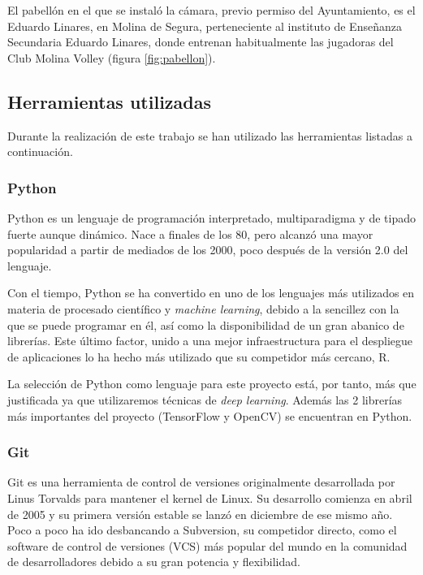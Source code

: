 El pabellón en el que se instaló la cámara, previo permiso del Ayuntamiento, es el Eduardo Linares, en Molina de Segura, perteneciente al instituto de Enseñanza Secundaria Eduardo Linares, donde entrenan habitualmente las jugadoras del Club Molina Volley (figura \ref{fig:pabellon}).


\subsection{Herramientas utilizadas}
Durante la realización de este trabajo se han utilizado las herramientas listadas a continuación.

\subsubsection*{Python}

Python es un lenguaje de programación interpretado, multiparadigma y de tipado fuerte aunque dinámico. Nace a finales de los 80, pero alcanzó una mayor popularidad a partir de mediados de los 2000, poco después de la versión 2.0 del lenguaje. 

Con el tiempo, Python se ha convertido en uno de los lenguajes más utilizados en materia de procesado científico y \textit{machine learning}, debido a la sencillez con la que se puede programar en él, así como la disponibilidad de un gran abanico de librerías. Este último factor, unido a una mejor infraestructura para el despliegue de aplicaciones lo ha hecho más utilizado que su competidor más cercano, R.

La selección de Python como lenguaje para este proyecto está, por tanto, más que justificada ya que utilizaremos técnicas de \textit{deep learning}. Además las 2 librerías más importantes del proyecto (TensorFlow y OpenCV) se encuentran en Python.

\subsubsection*{Git}

Git es una herramienta de control de versiones originalmente desarrollada por Linus Torvalds para mantener el kernel de Linux. Su desarrollo comienza en abril de 2005 y su primera versión estable se lanzó en diciembre de ese mismo año. Poco a poco ha ido desbancando a Subversion, su competidor directo, como el software de control de versiones (VCS) más popular del mundo en la comunidad de desarrolladores debido a su gran potencia y flexibilidad.

